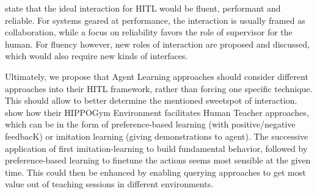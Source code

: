 \documentclass[twoside,11pt]{article}
\begin{document}
\citet{WuEtAl:2021:HITLMLSurvey} state that the ideal interaction for HITL would be fluent, performant and reliable. For systems geared at performance, the interaction is usually framed as collaboration, while a focus on reliability favors the role of supervisor for the human. For fluency however, new roles of interaction are proposed and discussed, which would also require new kinds of interfaces.

Ultimately, we propose that Agent Learning approaches should consider different approaches into their HITL framework, rather than forcing one specific technique. This should allow to better determine the mentioned sweetspot of interaction. \citet{WuEtAl:2021:HITLMLSurvey} show how their HIPPOGym Environment facilitates Human Teacher approaches, which can be in the form of preference-based learning (with positive/negative feedbacK) or imitation learning (giving demonstrations to agent). The successive application of first imitation-learning to build fundamental behavior, followed by preference-based learning to finetune the actions seems most sensible at the given time. This could then be enhanced by enabling querying approaches to get most value out of teaching sessions in different environments.


\end{document}
